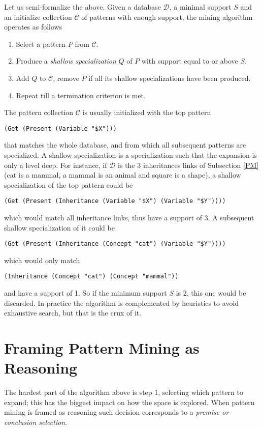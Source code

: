 \documentclass[runningheads]{llncs}
\begin{document}
Let us semi-formalize the above. Given a database $\mathcal{D}$, a
minimal support $S$ and an initialize collection $\mathcal{C}$ of
patterns with enough support, the mining algorithm operates as follows
\begin{enumerate}
\item Select a pattern $P$ from $\mathcal{C}$.
\item Produce a \emph{shallow specialization} $Q$ of $P$ with support
  equal to or above $S$.
\item Add $Q$ to $\mathcal{C}$, remove $P$ if all its shallow
  specializations have been produced.
\item Repeat till a termination criterion is met.
\end{enumerate}
The pattern collection $\mathcal{C}$ is usually initialized with the
top pattern
\begin{verbatim}
(Get (Present (Variable "$X")))
\end{verbatim}
that matches the whole database, and from which all subsequent
patterns are specialized. A shallow specialization is a specialization
such that the expansion is only a level deep. For instance, if
$\mathcal{D}$ is the 3 inheritances links of Subsection \ref{PM} (cat
is a mammal, a mammal is an animal and square is a shape), a shallow
specialization of the top pattern could be
\begin{verbatim}
(Get (Present (Inheritance (Variable "$X") (Variable "$Y"))))
\end{verbatim}
which would match all inheritance links, thus have a support of 3. A
subsequent shallow specialization of it could be
\begin{verbatim}
(Get (Present (Inheritance (Concept "cat") (Variable "$Y"))))
\end{verbatim}
which would only match
\begin{verbatim}
(Inheritance (Concept "cat") (Concept "mammal"))
\end{verbatim}
and have a support of 1. So if the minimum support $S$ is 2, this one
would be discarded. In practice the algorithm is complemented by
heuristics to avoid exhaustive search, but that is the crux of it.

\section{Framing Pattern Mining as Reasoning}
\label{FPMR}

The hardest part of the algorithm above is step 1, selecting which
pattern to expand; this has the biggest impact on how the space is
explored. When pattern mining is framed as reasoning such decision
corresponds to a \emph{premise or conclusion selection}.
\end{document}

